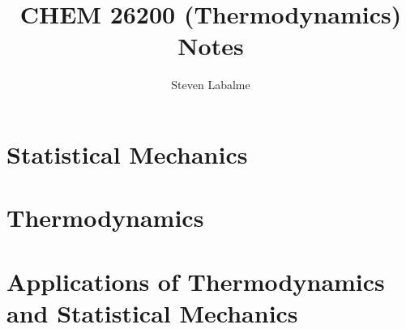\documentclass{report}
\title{CHEM 26200 (Thermodynamics) Notes}
\author{Steven Labalme}
\renewcommand{\chaptername}{Week}
\begin{document}
\maketitle



\tableofcontents
\listoffigures
\listoftables
\newpage



\pagestyle{main}
\renewcommand{\chaptermark}[1]{\markboth{\chaptername\ \thechapter\ (#1)}{}}
\part{Statistical Mechanics}




\part{Thermodynamics}






\part{Applications of Thermodynamics and Statistical Mechanics}






\printbibliography[heading=bibintoc]
\end{document}
